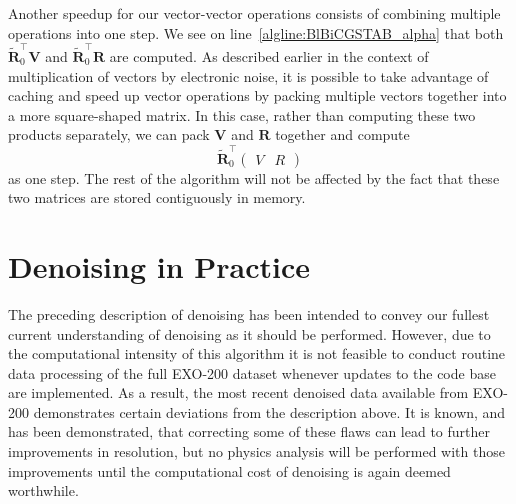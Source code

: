 Another speedup for our vector-vector operations consists of combining multiple operations into one step.  We see on line~\ref{algline:BlBiCGSTAB_alpha} that both $\mathbf{\widetilde{R}}_0^\top \mathbf{V}$ and $\mathbf{\widetilde{R}}_0^\top \mathbf{R}$ are computed.  As described earlier in the context of multiplication of vectors by electronic noise, it is possible to take advantage of caching and speed up vector operations by packing multiple vectors together into a more square-shaped matrix.  In this case, rather than computing these two products separately, we can pack $\mathbf{V}$ and $\mathbf{R}$ together and compute
\[\mathbf{\widetilde{R}}_0^\top \begin{pmatrix} V & R \end{pmatrix}\]
as one step.  The rest of the algorithm will not be affected by the fact that these two matrices are stored contiguously in memory.

\section{Denoising in Practice}\label{sec:DenoisingInPractice}

The preceding description of denoising has been intended to convey our fullest current understanding of denoising as it should be performed.  However, due to the computational intensity of this algorithm it is not feasible to conduct routine data processing of the full EXO-200 dataset whenever updates to the code base are implemented.  As a result, the most recent denoised data available from EXO-200 demonstrates certain deviations from the description above.  It is known, and has been demonstrated, that correcting some of these flaws can lead to further improvements in resolution, but no physics analysis will be performed with those improvements until the computational cost of denoising is again deemed worthwhile.

